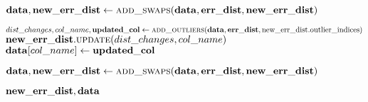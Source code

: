 \begin{algorithm}[!t]
\begin{algorithmic}[1]
      \STATE $\mathbf{data}, \mathbf{new\_err\_dist} \leftarrow \textsc{add\_swaps}(\mathbf{data}, \mathbf{err\_dist}, \mathbf{new\_err\_dist})$ 
      
       {
        \STATE $dist\_changes, col\_name, \mathbf{updated\_col} \leftarrow \textsc{add\_outliers}(\mathbf{data}, \mathbf{err\_dist}, \text{new\_err\_dist.outlier\_indices})$ 
        \STATE $\mathbf{new\_err\_dist}.\textsc{update}(dist\_changes, col\_name)$ 
        \STATE $\mathbf{data}[col\_name] \leftarrow \mathbf{updated\_col}$ 
      }\ENDFOR 
      
      \STATE $\mathbf{data}, \mathbf{new\_err\_dist} \leftarrow \textsc{add\_swaps}(\mathbf{data}, \mathbf{err\_dist}, \mathbf{new\_err\_dist})$ 
      
      \RETURN $\mathbf{new\_err\_dist}, \mathbf{data}$
    \end{algorithmic}
\end{algorithm}
